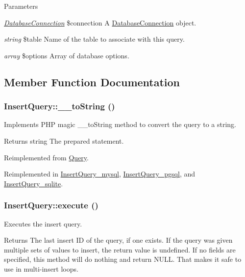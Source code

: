 \begin{DoxyParams}{Parameters}
\item[{\em \hyperlink{classDatabaseConnection}{DatabaseConnection}}]\$connection A \hyperlink{classDatabaseConnection}{DatabaseConnection} object. \item[{\em string}]\$table Name of the table to associate with this query. \item[{\em array}]\$options Array of database options. \end{DoxyParams}


\subsection{Member Function Documentation}
\hypertarget{classInsertQuery_a996fb0719632b8861284683c1ff711fa}{
\subsubsection[{\_\-\_\-toString}]{\setlength{\rightskip}{0pt plus 5cm}InsertQuery::\_\-\_\-toString ()}}
\label{classInsertQuery_a996fb0719632b8861284683c1ff711fa}
Implements PHP magic \_\-\_\-toString method to convert the query to a string.

\begin{DoxyReturn}{Returns}
string The prepared statement. 
\end{DoxyReturn}


Reimplemented from \hyperlink{classQuery_a16c3a3265666b784d49ce18a6fda9a8a}{Query}.

Reimplemented in \hyperlink{classInsertQuery__mysql_ab941db654e7813130a9147c74bff0b38}{InsertQuery\_\-mysql}, \hyperlink{classInsertQuery__pgsql_a784c39f2e4fa911ecb893243fcb3ab91}{InsertQuery\_\-pgsql}, and \hyperlink{classInsertQuery__sqlite_a67c0e3204921c1a8af4edc3fb60ba97c}{InsertQuery\_\-sqlite}.\hypertarget{classInsertQuery_a9bcd2f989e2ae0173bd6f58b6ede12fc}{
\subsubsection[{execute}]{\setlength{\rightskip}{0pt plus 5cm}InsertQuery::execute ()}}
\label{classInsertQuery_a9bcd2f989e2ae0173bd6f58b6ede12fc}
Executes the insert query.

\begin{DoxyReturn}{Returns}
The last insert ID of the query, if one exists. If the query was given multiple sets of values to insert, the return value is undefined. If no fields are specified, this method will do nothing and return NULL. That makes it safe to use in multi-\/insert loops. 
\end{DoxyReturn}


